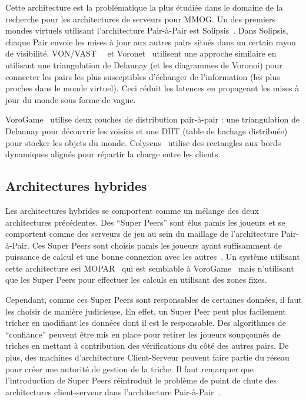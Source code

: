 Cette architecture est la problématique la plus étudiée dans le domaine de la recherche pour les architectures de serveurs pour MMOG.
Un des premiers mondes virtuels utilisant l'architecture Pair-à-Pair est Solipsis~\cite{solipsis}.
Dans Solipsis, chaque Pair envoie les mises à jour aux autres pairs situés dans un certain rayon de visibilité.
VON/VAST~\cite{VON}~\cite{VAST} et Voronet~\cite{voronet} utilisent une approche similaire en utilisant une triangulation de Delaunay (et les diagrammes de Voronoi) pour connecter les pairs les plus susceptibles d'échanger de l'information (les plus proches dans le monde virtuel).
Ceci réduit les latences en propageant les mises à jour du monde sous forme de vague.

VoroGame~\cite{vorogame} utilise deux couches de distribution pair-à-pair : une triangulation de Delaunay pour découvrir les voisins et une DHT (table de hachage distribuée) pour stocker les objets du monde.
Colyseus~\cite{colyseus} utilise des rectangles aux bords dynamiques alignés pour répartir la charge entre les clients.

\subsection{Architectures hybrides}
Les architectures hybrides se comportent comme un mélange des deux architectures précédentes.
Des ``Super Peers'' sont élus pamis les joueurs et se comportent comme des serveurs de jeu au sein du maillage de l'architecture Pair-à-Pair.
Ces Super Peers sont choisis pamis les joueurs ayant suffisamment de puissance de calcul et une bonne connexion avec les autres~\cite{super_peer_network}.
Un système utilisant cette architecture est MOPAR~\cite{MOPAR} qui est semblable à VoroGame~\cite{vorogame} mais n'utilisant que les Super Peers pour effectuer les calculs en utilisant des zones fixes.

Cependant, comme ces Super Peers sont responsables de certaines données, il faut les choisir de manière judicieuse.
En effet, un Super Peer peut plus facilement tricher en modifiant les données dont il est le responsable.
Des algorithmes de ``confiance'' peuvent être mis en place pour retirer les joueurs soupçonnés de triches en mettant à contribution des vérifications du côté des autres pairs.
De plus, des machines d'architecture Client-Serveur peuvent faire partie du réseau pour créer une autorité de gestion de la triche.
Il faut remarquer que l'introduction de Super Peers réintroduit le problème de point de chute des architectures client-serveur dans l'architecture Pair-à-Pair~\cite{design_issues_for_p2p_mmog}.

